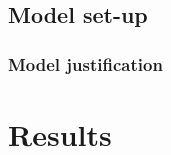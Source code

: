 \documentclass[
  letterpaper,
  DIV=11,
  numbers=noendperiod]{scrartcl}
\begin{document}
\hypertarget{model-set-up}{%
\subsection{Model set-up}\label{model-set-up}}

\hypertarget{model-justification}{%
\subsubsection{Model justification}\label{model-justification}}

\hypertarget{results}{%
\section{Results}\label{results}}

\hypertarget{tbl-model-summary-table}{}
\end{document}
